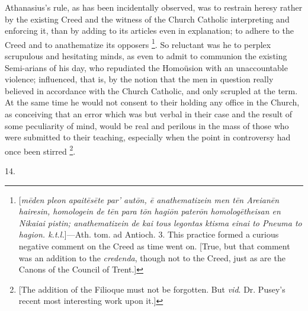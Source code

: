 Athanasius's rule, as has been incidentally observed, was to
restrain heresy rather by the existing Creed and the witness of the
Church Catholic interpreting and enforcing it, than by adding to its
articles even in explanation; to adhere to the Creed and to
anathematize its opposers \footnote{[\emph{m\={e}den pleon apait\={e}s\={e}te
par' aut\={o}n, \={e} anathematizein men t\={e}n Areian\={e}n
hairesin, homologein de t\={e}n para t\={o}n hagi\={o}n pater\={o}n
homolog\={e}theisan en Nikaiai pistin; anathematizein de kai tous
legontas ktisma einai to Pneuma to hagion. k.t.l.}]—Ath. tom. ad
Antioch. 3. This practice formed a curious negative comment on the
Creed as time went on. [True, but that comment was an addition to the \emph{credenda},
though not to the Creed, just as are the Canons of the Council of
Trent.]}.
So reluctant was he to perplex scrupulous and hesitating minds, as
even to admit to communion the existing Semi-arians of his day, who
repudiated the Homoüsion with an unaccountable violence; influenced,
that is, by the notion that the men in question really believed in
accordance with the Church Catholic, and only scrupled at the term. At the same time he would not consent to their holding any
office in the Church, as conceiving that an error which was but verbal
in their case and the result of some peculiarity of mind, would be
real and perilous in the mass of those who were submitted to their
teaching, especially when the point in controversy had once been
stirred \footnote{[The addition of the Filioque must not be
forgotten. But \emph{vid}. Dr. Pusey's recent most interesting work
upon it.]}.

14.

